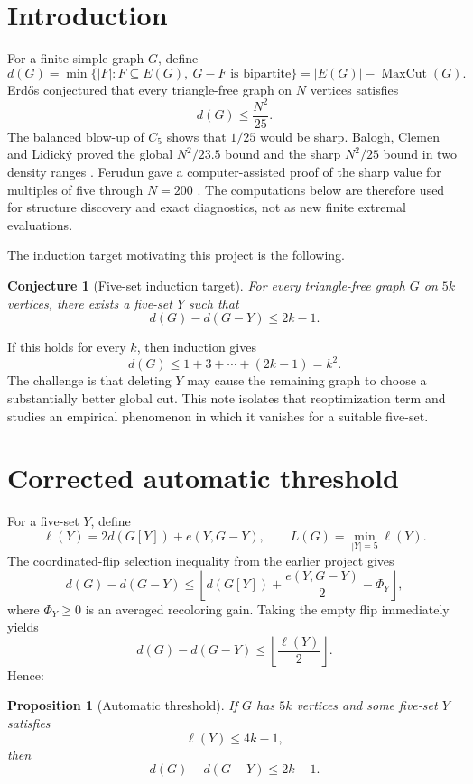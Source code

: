 \documentclass[11pt]{article}
\newtheorem{proposition}{Proposition}
\newtheorem{conjecture}{Conjecture}
\newcommand{\mc}{\operatorname{MaxCut}}
\newcommand{\dd}{d}
\begin{document}
\section{Introduction}

For a finite simple graph $G$, define
\[
\dd(G)=\min\{|F|:F\subseteq E(G),\ G-F\text{ is bipartite}\}
      =|E(G)|-\mc(G).
\]
Erd\H{o}s conjectured that every triangle-free graph on $N$ vertices
satisfies
\[
\dd(G)\le \frac{N^2}{25}.
\]
The balanced blow-up of $C_5$ shows that $1/25$ would be sharp.  Balogh,
Clemen and Lidick\'y proved the global $N^2/23.5$ bound and the sharp
$N^2/25$ bound in two density ranges \cite{BCL}.  Ferudun gave a
computer-assisted proof of the sharp value for multiples of five through
$N=200$ \cite{Ferudun}.  The computations below are therefore used for
structure discovery and exact diagnostics, not as new finite extremal
evaluations.

The induction target motivating this project is the following.

\begin{conjecture}[Five-set induction target]
For every triangle-free graph $G$ on $5k$ vertices, there exists a five-set
$Y$ such that
\[
\dd(G)-\dd(G-Y)\le 2k-1.
\]
\end{conjecture}

If this holds for every $k$, then induction gives
\[
\dd(G)\le 1+3+\cdots +(2k-1)=k^2.
\]
The challenge is that deleting $Y$ may cause the remaining graph to choose
a substantially better global cut.  This note isolates that reoptimization
term and studies an empirical phenomenon in which it vanishes for a
suitable five-set.

\section{Corrected automatic threshold}

For a five-set $Y$, define
\[
\ell(Y)=2\dd(G[Y])+e(Y,G-Y),
\qquad
L(G)=\min_{|Y|=5}\ell(Y).
\]
The coordinated-flip selection inequality from the earlier project gives
\[
\dd(G)-\dd(G-Y)
\le
\left\lfloor
\dd(G[Y])+\frac{e(Y,G-Y)}2-\Phi_Y
\right\rfloor,
\]
where $\Phi_Y\ge0$ is an averaged recoloring gain.  Taking the empty flip
immediately yields
\[
\dd(G)-\dd(G-Y)
\le
\left\lfloor\frac{\ell(Y)}2\right\rfloor.
\]
Hence:

\begin{proposition}[Automatic threshold]
If $G$ has $5k$ vertices and some five-set $Y$ satisfies
\[
\ell(Y)\le 4k-1,
\]
then
\[
\dd(G)-\dd(G-Y)\le 2k-1.
\]
\end{proposition}
\end{document}
